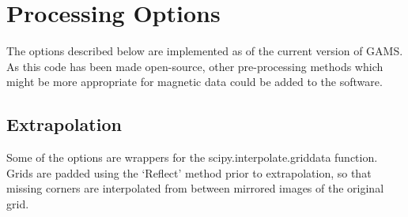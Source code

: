 \documentclass[letterpaper,10pt,english,openany,oneside]{sphinxmanual}
\begin{document}
\chapter{Processing Options}
\label{\detokenize{index:processing-options}}
The options described below are implemented as of the current version of GAMS. As this code has been made open-source, other pre-processing methods which might be more appropriate for magnetic data could be added to the software.


\section{Extrapolation}
\label{\detokenize{index:extrapolation}}\label{\detokenize{content/preprocessing/extrapolation:extrapolation}}
Some of the options are wrappers for the scipy.interpolate.griddata function. Grids are padded using the ‘Reflect’ method prior to extrapolation, so that missing corners are interpolated from between mirrored images of the original grid.
\end{document}
